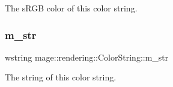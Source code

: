 The s\+R\+GB color of this color string. \hypertarget{classmage_1_1rendering_1_1_color_string_a226202625fbe205d78e1412310a49f1f}{}\label{classmage_1_1rendering_1_1_color_string_a226202625fbe205d78e1412310a49f1f} 
\subsubsection{\texorpdfstring{m\+\_\+str}{m\_str}}
{\footnotesize\ttfamily wstring mage\+::rendering\+::\+Color\+String\+::m\+\_\+str\hspace{0.3cm}{\ttfamily [private]}}

The string of this color string. 
